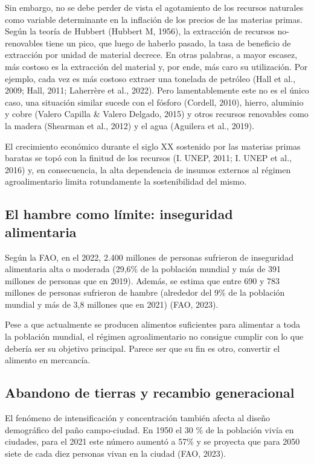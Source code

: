\documentclass[a4paper, nobind]{templates/ociamthesis}
\begin{document}
Sin embargo, no se debe perder de vista el agotamiento de los recursos
naturales como variable determinante en la inflación de los precios de
las materias primas. Según la teoría de Hubbert (Hubbert M, 1956), la
extracción de recursos no-renovables tiene un pico, que luego de haberlo
pasado, la tasa de beneficio de extracción por unidad de material
decrece. En otras palabras, a mayor escasez, más costoso es la
extracción del material y, por ende, más caro su utilización. Por
ejemplo, cada vez es más costoso extraer una tonelada de petróleo
(Hall et al., 2009; Hall, 2011; Laherrère et al., 2022). Pero
lamentablemente este no es el único caso, una situación similar sucede
con el fósforo (Cordell, 2010), hierro, aluminio y cobre
(Valero Capilla \& Valero Delgado, 2015) y otros recursos renovables como la madera
(Shearman et al., 2012) y el agua (Aguilera et al., 2019).

El crecimiento económico durante el siglo XX sostenido por las materias
primas baratas se topó con la finitud de los recursos
(I. UNEP, 2011; I. UNEP et al., 2016) y, en consecuencia, la alta
dependencia de insumos externos al régimen agroalimentario limita
rotundamente la sostenibilidad del mismo.

\hypertarget{hambre}{%
\subsection{El hambre como límite: inseguridad alimentaria}\label{hambre}}

Según la FAO, en el 2022, 2.400 millones de personas sufrieron de
inseguridad alimentaria alta o moderada (29,6\% de la población mundial y
más de 391 millones de personas que en 2019). Además, se estima que
entre 690 y 783 millones de personas sufrieron de hambre (alrededor del
9\% de la población mundial y más de 3,8 millones que en 2021)
(FAO, 2023).

Pese a que actualmente se producen alimentos suficientes para alimentar
a toda la población mundial, el régimen agroalimentario no consigue
cumplir con lo que debería ser su objetivo principal. Parece ser que su
fin es otro, convertir el alimento en mercancía.

\hypertarget{abandono_tierras}{%
\subsection{Abandono de tierras y recambio generacional}\label{abandono_tierras}}

El fenómeno de intensificación y concentración también afecta al diseño
demográfico del paño campo-ciudad. En 1950 el 30 \% de la población vivía
en ciudades, para el 2021 este número aumentó a 57\% y se proyecta que
para 2050 siete de cada diez personas vivan en la ciudad (FAO, 2023).
\end{document}
